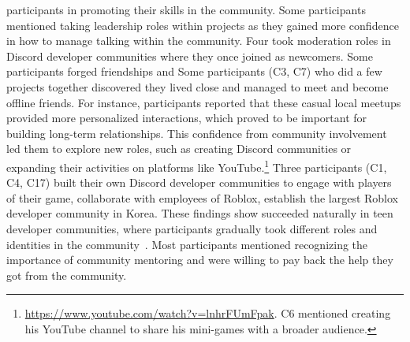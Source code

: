 
participants  in promoting their skills in the community. Some participants  mentioned taking leadership roles within projects as they gained more confidence in how to manage talking within the community. Four  took moderation roles in Discord developer communities where they once joined as newcomers. Some participants forged friendships and  Some participants (C3, C7) who did a few projects together discovered they lived close  and managed to meet and become offline friends. For instance, participants reported that these casual local meetups provided more personalized interactions, which proved to be important for building long-term relationships. This confidence from community involvement led them to explore new roles, such as creating Discord communities or expanding their activities on platforms like YouTube.\footnote{\url{https://www.youtube.com/watch?v=lnhrFUmFpak}. C6 mentioned creating his YouTube channel to share his mini-games with a broader audience.} Three participants (C1, C4, C17) built their own Discord developer communities to engage with players of their game, collaborate with employees of Roblox,  establish the largest Roblox developer community in Korea. These findings show  succeeded naturally in teen developer communities, where participants gradually took different roles and identities in the community~\cite{li2009evolution}. Most participants mentioned recognizing the importance of community mentoring and were willing to pay back the help they got from the community.

\begin{quote}
\end{quote}

